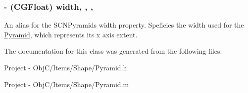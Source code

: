 \subsubsection[{width}]{\setlength{\rightskip}{0pt plus 5cm}-\/ (C\+G\+Float) width\hspace{0.3cm}{\ttfamily [read]}, {\ttfamily [write]}, {\ttfamily [nonatomic]}, {\ttfamily [assign]}}\label{interface_pyramid_ab2570e0bbae1af62c447ac3153e90cb8}
An alias for the S\+C\+N\+Pyramid\textquotesingle{}s {\ttfamily width} property. Speficies the width used for the \hyperlink{interface_pyramid}{Pyramid}, which represents its {\ttfamily x} axis extent. 

The documentation for this class was generated from the following files\+:\begin{DoxyCompactItemize}
\item 
Project -\/ Obj\+C/\+Items/\+Shape/Pyramid.\+h\item 
Project -\/ Obj\+C/\+Items/\+Shape/Pyramid.\+m\end{DoxyCompactItemize}
